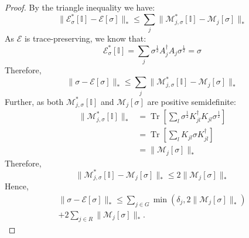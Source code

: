 \documentclass[aps,floatfix,10pt,amssymb,amsfont,amsmath,superscriptaddress,float,nofootinbib,longbibliography,nobalancelastpage,twocolumn]{revtex4-2}
\begin{document}
\begin{proof}
    By the triangle inequality we have:
    \begin{equation}
        \|\mathcal{E}^*_{\sigma}[\mathbb{I}]-\mathcal{E}[\sigma]\|_* \leq \sum_j \|\mathcal{M}^*_{j,\sigma}[\mathbb{I}]-\mathcal{M}_{j}[\sigma]\|_*
    \end{equation}
    As $\mathcal{E}$ is trace-preserving, we know that:
    \begin{equation}
        \mathcal{E}^*_{\sigma}[\mathbb{I}] = \sum_{j} \sigma^{\frac{1}{2}}A^{\dagger}_{j} A_{j}\sigma^{\frac{1}{2}} = \sigma
    \end{equation}
    Therefore,
    \begin{equation}
        \|\sigma - \mathcal{E}[\sigma]\|_* \leq \sum_j \|\mathcal{M}^*_{j,\sigma}[\mathbb{I}]-\mathcal{M}_{j}[\sigma]\|_*
    \end{equation}
    Further, as both
$\mathcal{M}_{j,\sigma}^{*}[\mathbb{I}]$ and
$\mathcal{M}_j[\sigma]$ are positive semidefinite:
    \begin{align}
        \|\mathcal{M}^*_{j,\sigma}[\mathbb{I}]\|_* &= \operatorname{Tr}\left[\sum_l \sigma^{\frac{1}{2}} K_{jl}^{\dagger} K_{jl} \sigma^{\frac{1}{2}}\right]\\
        &= \operatorname{Tr}\left[\sum_l K_{jl}\sigma K_{jl}^{\dagger}\right]\\
        &= \|\mathcal{M}_{j}[\sigma]\|_*
    \end{align}
    Therefore,
    \begin{equation}
         \|\mathcal{M}^*_{j,\sigma}[\mathbb{I}]-\mathcal{M}_{j}[\sigma]\|_* \leq 2\|\mathcal{M}_{j}[\sigma]\|_*
    \end{equation}
    Hence,
    \begin{multline}
        \|\sigma-\mathcal{E}[\sigma]\|_* \leq
        \sum_{j\in G}\min\left(\delta_j,2\|\mathcal{M}_j[\sigma]\|_*\right)\\
        +2\sum_{j\in R}\|\mathcal{M}_j[\sigma]\|_*.
    \end{multline}
\end{proof}
\end{document}
